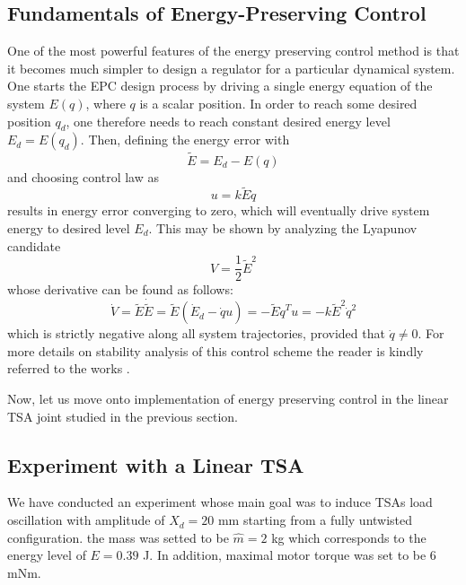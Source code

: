 \subsection{Fundamentals of Energy-Preserving Control}

One of the most powerful features of the energy preserving control method is that it becomes much simpler to design a regulator for a particular dynamical system. One starts the EPC design process by driving a single energy equation of the system $E(q)$, where $q$ is a scalar position. In order to reach some desired position $q_d$, one therefore needs to reach constant desired energy level $E_d = E(q_d)$. Then, defining the energy error with
\begin{equation*}
    \tilde{E} = E_d - E(q)
\end{equation*}
and choosing control law as
\begin{equation}\label{eq.con:epc}
    u = k\tilde{E}\dot{q}
\end{equation}
results in energy error converging to zero, which will eventually drive system energy to desired level $E_d$. This may be shown by analyzing the Lyapunov candidate 
\begin{equation}\label{eq:v_dot}
    V = \frac{1}{2}\tilde{E}^2
\end{equation}
whose derivative can be found as follows:
\begin{equation}\label{eq:v_dot}
    \dot{V} = \tilde{E}\dot{\tilde{E}} = \tilde{E} ( \dot{E}_d - \dot{q} u) = -\tilde{E} \dot{q}^T u= -k\tilde{E}^2\dot{q}^2
\end{equation}
which is strictly negative along all system trajectories, provided that $\dot{q}\neq0$. For more details on stability analysis of this control scheme the reader is kindly referred to the works \cite{iwashiro1996energy,spong1996energy}.

Now, let us move onto implementation of energy preserving control in the linear TSA joint studied in the previous section.
 
\subsection{Experiment with a Linear TSA}

We have conducted an experiment whose main goal was to induce TSAs load oscillation with amplitude of $X_d = 20$ mm starting from a fully untwisted configuration. the mass was setted to be $\hat{m} = 2$ kg which corresponds to the energy level of $E = 0.39$ J. In addition, maximal motor torque was set to be 6 mNm. 

